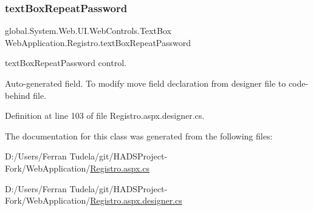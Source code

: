 \subsubsection{\texorpdfstring{textBoxRepeatPassword}{textBoxRepeatPassword}}
{\footnotesize\ttfamily global.\+System.\+Web.\+U\+I.\+Web\+Controls.\+Text\+Box Web\+Application.\+Registro.\+text\+Box\+Repeat\+Password\hspace{0.3cm}{\ttfamily [protected]}}



text\+Box\+Repeat\+Password control. 

Auto-\/generated field. To modify move field declaration from designer file to code-\/behind file. 

Definition at line 103 of file Registro.\+aspx.\+designer.\+cs.



The documentation for this class was generated from the following files\+:\begin{DoxyCompactItemize}
\item 
D\+:/\+Users/\+Ferran Tudela/git/\+H\+A\+D\+S\+Project-\/\+Fork/\+Web\+Application/\mbox{\hyperlink{Registro_8aspx_8cs}{Registro.\+aspx.\+cs}}\item 
D\+:/\+Users/\+Ferran Tudela/git/\+H\+A\+D\+S\+Project-\/\+Fork/\+Web\+Application/\mbox{\hyperlink{Registro_8aspx_8designer_8cs}{Registro.\+aspx.\+designer.\+cs}}\end{DoxyCompactItemize}

